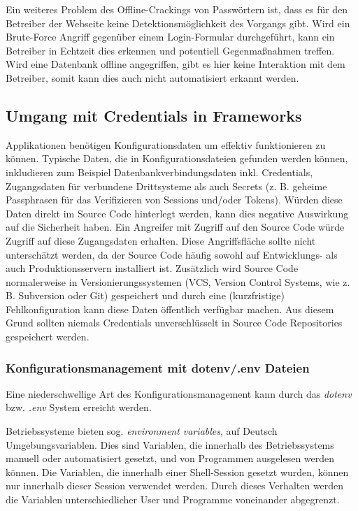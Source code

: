 Ein weiteres Problem des Offline-Crackings von Passwörtern ist, dass es für den Betreiber der Webseite keine Detektionsmöglichkeit des Vorgangs gibt. Wird ein Brute-Force Angriff gegenüber einem Login-Formular durchgeführt, kann ein Betreiber in Echtzeit dies erkennen und potentiell Gegenmaßnahmen treffen. Wird eine Datenbank offline angegriffen, gibt es hier keine Interaktion mit dem Betreiber, somit kann dies auch nicht automatisiert erkannt werden.

\subsection{Umgang mit Credentials in Frameworks}

Applikationen benötigen Konfigurationsdaten um effektiv funktionieren zu können. Typische Daten, die in Konfigurationsdateien gefunden werden können, inkludieren zum Beispiel Datenbankverbindungsdaten inkl. Credentials, Zugangsdaten für verbundene Drittsysteme als auch Secrets (z. B. geheime Passphrasen für das Verifizieren von Sessions und/oder Tokens). Würden diese Daten direkt im Source Code hinterlegt werden, kann dies negative Auswirkung auf die Sicherheit haben. Ein Angreifer mit Zugriff auf den Source Code würde Zugriff auf diese Zugangsdaten erhalten. Diese Angriffsfläche sollte nicht unterschätzt werden, da der Source Code häufig sowohl auf Entwicklungs- als auch Produktionsservern installiert ist. Zusätzlich wird Source Code normalerweise in Versionierungssystemen (VCS, Version Control Systems, wie z. B. Subversion oder Git) gespeichert und durch eine (kurzfristige) Fehlkonfiguration kann diese Daten öffentlich verfügbar machen. Aus diesem Grund sollten niemals Credentials unverschlüsselt in Source Code Repositories gespeichert werden.

\subsubsection{Konfigurationsmanagement mit dotenv/.env Dateien}

Eine niederschwellige Art des Konfigurationsmanagement kann durch das \textit{dotenv} bzw. \textit{.env} System erreicht werden.

Betriebssysteme bieten sog. \textit{environment variables}, auf Deutsch Umgebungsvariablen. Dies sind Variablen, die innerhalb des Betriebssystems manuell oder automatisiert gesetzt, und von Programmen ausgelesen werden können. Die Variablen, die innerhalb einer Shell-Session gesetzt wurden, können nur innerhalb dieser Session verwendet werden. Durch dieses Verhalten werden die Variablen unterschiedlicher User und Programme voneinander abgegrenzt.

